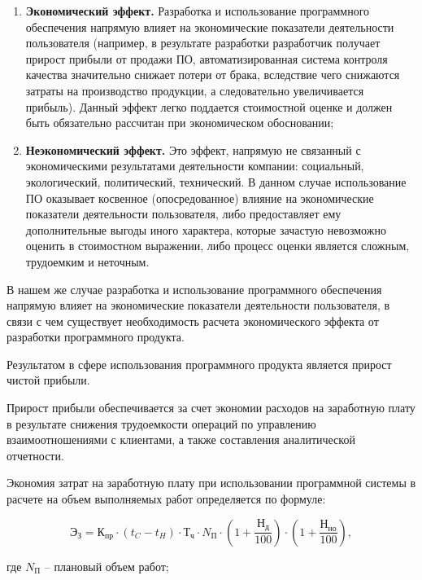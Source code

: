 \begin{enumerate}
    \item{\textbf{Экономический эффект.} Разработка и использование программного обеспечения напрямую влияет на экономические показатели деятельности пользователя (например, в результате разработки разработчик получает прирост прибыли от продажи ПО, автоматизированная система контроля качества значительно снижает потери от брака, вследствие чего снижаются затраты на производство продукции, а следовательно увеличивается прибыль). Данный эффект легко поддается стоимостной оценке и должен быть обязательно рассчитан при экономическом обосновании;}
    \item{\textbf{Неэкономический эффект.} Это эффект, напрямую не связанный с экономическими результатами деятельности компании: социальный, экологический, политический, технический. В данном случае использование ПО оказывает косвенное (опосредованное) влияние на экономические показатели деятельности пользователя, либо предоставляет ему дополнительные выгоды иного характера, которые зачастую невозможно оценить в стоимостном выражении, либо процесс оценки является сложным, трудоемким и неточным.}

\end{enumerate}

В нашем же случае разработка и использование программного обеспечения напрямую влияет на экономические показатели деятельности пользователя, в связи с чем существует необходимость расчета экономического эффекта от разработки программного продукта.

Результатом в сфере использования программного продукта является прирост чистой прибыли.

Прирост прибыли обеспечивается за счет экономии расходов на заработную плату в результате снижения трудоемкости операций по управлению взаимоотношениями с клиентами, а также составления аналитической отчетности.

Экономия затрат на заработную плату при использовании программной системы в расчете на объем выполняемых работ определяется по формуле:

\begin{equation}
    \text{Э}_{\text{З}} = \text{К}_{\text{пр}}\cdot (t_{C}-t_{H})\cdot \text{Т}_{\text{ч}}\cdot N_{\text{П}}\cdot  (1+\frac{\text{Н}_{\text{д}}}{100})\cdot (1+\frac{\text{Н}_{\text{но}}}{100}),
\end{equation}

где $N_{\text{П}}$ -- плановый объем работ;

